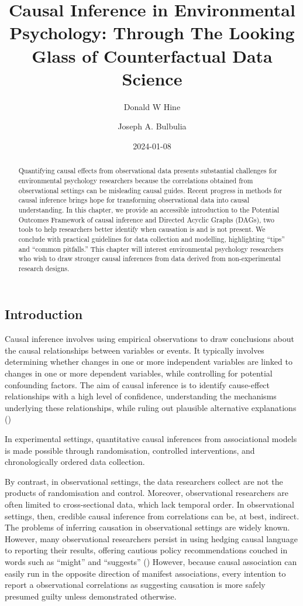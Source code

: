 \documentclass[
  singlecolumn]{article}
\title{Causal Inference in Environmental Psychology: Through The Looking
Glass of Counterfactual Data Science}
\author{Donald W Hine \and Joseph A. Bulbulia}
\date{2024-01-08}
\begin{document}
\maketitle
\begin{abstract}
Quantifying causal effects from observational data presents substantial
challenges for environmental psychology researchers because the
correlations obtained from observational settings can be misleading
causal guides. Recent progress in methods for causal inference brings
hope for transforming observational data into causal understanding. In
this chapter, we provide an accessible introduction to the Potential
Outcomes Framework of causal inference and Directed Acyclic Graphs
(DAGs), two tools to help researchers better identify when causation is
and is not present. We conclude with practical guidelines for data
collection and modelling, highlighting ``tips'' and ``common pitfalls.''
This chapter will interest environmental psychology researchers who wish
to draw stronger causal inferences from data derived from
non-experimental research designs.
\end{abstract}
\subsection{Introduction}\label{introduction}

Causal inference involves using empirical observations to draw
conclusions about the causal relationships between variables or events.
It typically involves determining whether changes in one or more
independent variables are linked to changes in one or more dependent
variables, while controlling for potential confounding factors. The aim
of causal inference is to identify cause-effect relationships with a
high level of confidence, understanding the mechanisms underlying these
relationships, while ruling out plausible alternative explanations
()

In experimental settings, quantitative causal inferences from
associational models is made possible through randomisation, controlled
interventions, and chronologically ordered data collection.

By contrast, in observational settings, the data researchers collect are
not the products of randomisation and control. Moreover, observational
researchers are often limited to cross-sectional data, which lack
temporal order. In observational settings, then, credible causal
inference from correlations can be, at best, indirect. The problems of
inferring causation in observational settings are widely known. However,
many observational researchers persist in using hedging causal language
to reporting their results, offering cautious policy recommendations
couched in words such as ``might'' and ``suggests''
() However, because causal
association can easily run in the opposite direction of manifest
associations, every intention to report a observational correlations as
suggesting causation is more safely presumed guilty unless demonstrated
otherwise.
\end{document}

